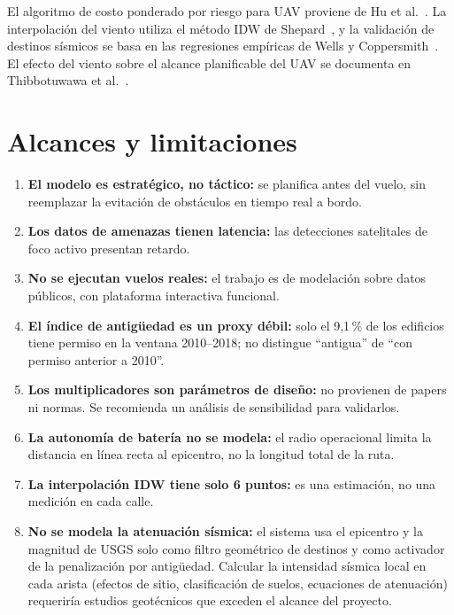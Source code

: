 \documentclass[conference]{IEEEtran}
\begin{document}
El algoritmo de costo ponderado por riesgo para UAV proviene de Hu et al.~\cite{hu2020}. La interpolación del viento utiliza el método IDW de Shepard~\cite{shepard1968}, y la validación de destinos sísmicos se basa en las regresiones empíricas de Wells y Coppersmith~\cite{wells1994}. El efecto del viento sobre el alcance planificable del UAV se documenta en Thibbotuwawa et al.~\cite{thibbotuwawa2020}.

\section{Alcances y limitaciones}
\label{sec:limitaciones}

\begin{enumerate}[label=\arabic*.,leftmargin=1.4em,itemsep=2pt]
\item \textbf{El modelo es estratégico, no táctico:} se planifica antes del vuelo, sin reemplazar la evitación de obstáculos en tiempo real a bordo.
\item \textbf{Los datos de amenazas tienen latencia:} las detecciones satelitales de foco activo presentan retardo.
\item \textbf{No se ejecutan vuelos reales:} el trabajo es de modelación sobre datos públicos, con plataforma interactiva funcional.
\item \textbf{El índice de antigüedad es un proxy débil:} solo el 9,1\,\% de los edificios tiene permiso en la ventana 2010--2018; no distingue ``antigua'' de ``con permiso anterior a 2010''.
\item \textbf{Los multiplicadores son parámetros de diseño:} no provienen de papers ni normas. Se recomienda un análisis de sensibilidad para validarlos.
\item \textbf{La autonomía de batería no se modela:} el radio operacional limita la distancia en línea recta al epicentro, no la longitud total de la ruta.
\item \textbf{La interpolación IDW tiene solo 6 puntos:} es una estimación, no una medición en cada calle.
\item \textbf{No se modela la atenuación sísmica:} el sistema usa el epicentro y la magnitud de USGS solo como filtro geométrico de destinos y como activador de la penalización por antigüedad. Calcular la intensidad sísmica local en cada arista (efectos de sitio, clasificación de suelos, ecuaciones de atenuación) requeriría estudios geotécnicos que exceden el alcance del proyecto.
\end{enumerate}
\end{document}
